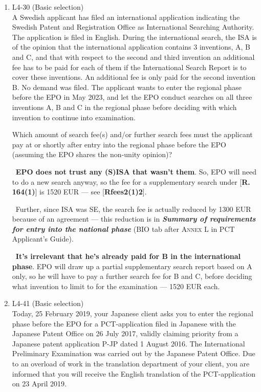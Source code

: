 \documentclass{report}
\newcommand{\s}{\adforn{74} \ }
\begin{document}
\begin{enumerate}[label=\textbf{Answer \arabic*}]
\begin{enumerate}[label=\textbf{Answer \arabic*}]
    \vspace{1em}
    
    \item %
    L4-30 (Basic selection) \\
    A Swedish applicant has filed an international application indicating the Swedish Patent and Registration Office as International Searching Authority. The application is filed in English. During the international search, the ISA is of the opinion that the international application contains 3 inventions, A, B and C, and that with respect to the second and third invention an additional fee has to be paid for each of them if the International Search Report is to cover these inventions. An additional fee is only paid for the second invention B. No demand was filed. The applicant wants to enter the regional phase before the EPO in May 2023, and let the EPO conduct searches on all three inventions A, B and C in the regional phase before deciding with which invention to continue into examination.
    
    
    Which amount of search fee(s) and/or further search fees must the applicant pay at or shortly after entry into the regional phase before the EPO (assuming the EPO shares the non-unity opinion)?
    \vspace{1em}
    
    \s \textbf{EPO does not trust any (S)ISA that wasn't them}. So, EPO will need to do a new search anyway, so the fee for a supplementary search under [\textbf{R. 164(1)}] is 1520 \textsc{EUR} --- see [\textbf{Rfees2(1)2}].
    
    \s Further, since ISA was \textsc{SE}, the search fee is actually reduced by \textsc{1300 EUR} because of an agreement --- this reduction is in \textbf{\textit{Summary of requirements for entry into the national phase}} (\textsc{BIO} tab after \textsc{Annex L} in PCT Applicant's Guide).
    
    \s \textbf{It's irrelevant that he's already paid for B in the international phase}. EPO will draw up a partial supplementary search report based on A only, so he will have to pay a further search fee for B and C, before deciding what invention to limit to for the examination --- \textsc{1520 EUR} each. 
    
    
    
    
    \item %
    L4-41 (Basic selection) \\
    Today, 25 February 2019, your Japanese client asks you to enter the regional phase before the EPO for a PCT-application filed in Japanese with the Japanese Patent Office on 26 July 2017, validly claiming priority from a Japanese patent application P-JP dated 1 August 2016. The International Preliminary Examination was carried out by the Japanese Patent Office. Due to an overload of work in the translation department of your client, you are informed that you will receive the English translation of the PCT-application on 23 April 2019.
    

\end{enumerate}
\end{enumerate}
\end{document}
